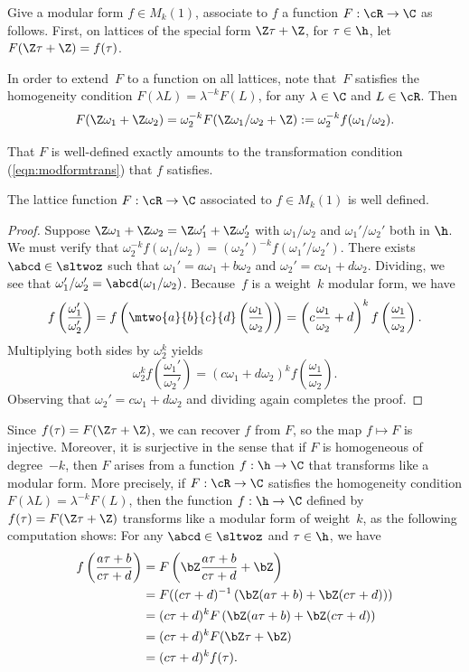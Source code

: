 \documentclass{report}
\begin{document}
Give a modular form $f\in M_k(1)$, associate to $f$ a function
$F:\cR\to\C$ as follows.  First, on lattices of the special form
$\Z\tau+\Z$, for $\tau\in\h$, let $F(\Z\tau+\Z) = f(\tau)$.

In order to extend~$F$ to a function on all lattices, note that~$F$
satisfies the homogeneity condition $F(\lambda L)=\lambda^{-k} F(L)$,
for any $\lambda\in\C$ and $L\in\cR$. Then
\[
  F(\Z\omega_1 + \Z\omega_2) = \omega_2^{-k} F(\Z\omega_1/\omega_2 + \Z)
            := \omega_2^{-k} f(\omega_1/\omega_2).
\]

That $F$ is well-defined exactly amounts to the transformation
condition (\ref{eqn:modformtrans}) that $f$ satisfies.
\begin{lemma}\label{lem:Fwelldef}
The lattice function $F:\cR\to \C$ associated to $f\in M_k(1)$ is
well defined.
\end{lemma}
\begin{proof}
Suppose $\Z\omega_1 + \Z\omega_2 = \Z\omega_1'+\Z\omega_2'$ with
$\omega_1/\omega_2$ and $\omega_1'/\omega_2'$ both in $\h$. We
must verify that $\omega_2^{-k}f(\omega_1/\omega_2) =
(\omega_2')^{-k}f(\omega_1'/\omega_2')$.  There exists
$\abcd\in\sltwoz$ such that $\omega_1'=a\omega_1+b\omega_2$ and
$\omega_2'=c\omega_1 + d\omega_2$.  Dividing, we see that
$\omega_1'/\omega_2' = \abcd(\omega_1/\omega_2)$.  Because~$f$ is
a weight~$k$ modular form, we have
\[
  f\left(\frac{\omega_1'}{\omega_2'}\right)
  =  f\left(\mtwo{a}{b}{c}{d}\left(\frac{\omega_1}{\omega_2}\right)\right)
  = \left(c\frac{\omega_1}{\omega_2} + d\right)^{k}f\left(\frac{\omega_1}{\omega_2}\right).
\]
Multiplying both sides by $\omega_2^k$ yields
\[
   \omega_2^k f\left(\frac{\omega_1'}{\omega_2'}\right)
  = (c\omega_1 + d\omega_2)^k
f\left(\frac{\omega_1}{\omega_2}\right).
\]
Observing that $\omega_2'=c\omega_1+d\omega_2$ and dividing again
completes the proof.
\end{proof}
Since $f(\tau) = F(\Z\tau + \Z)$, we can recover $f$ from $F$, so
the map $f\mapsto F$ is injective.  Moreover, it is surjective in
the sense that if $F$ is homogeneous of degree~$-k$, then $F$
arises from a function $f:\h\to\C$ that transforms like a modular
form.  More precisely, if $F:\cR\to \C$ satisfies the homogeneity
condition $F(\lambda L)=\lambda^{-k} F(L)$, then the function
$f:\h\to\C$ defined by $f(\tau) = F(\Z\tau+\Z)$ transforms like a
modular form of weight~$k$, as the following computation shows:
For any $\abcd\in\sltwoz$ and $\tau\in\h$, we have
\begin{align*}
f\left(\frac{a\tau+b}{c\tau+d}\right)&=
  F\left(\bZ\frac{a\tau+b}{c\tau+d}+\bZ\right)\\
&= F((c\tau+d)^{-1}\left(\bZ(a\tau+b)+\bZ(c\tau+d))\right)\\
&= (c\tau+d)^k F\left(\bZ(a\tau+b)+\bZ(c\tau+d)\right)\\
&= (c\tau+d)^k F(\bZ\tau+\bZ)\\
&= (c\tau+d)^k f(\tau).
\end{align*}
\end{document}
